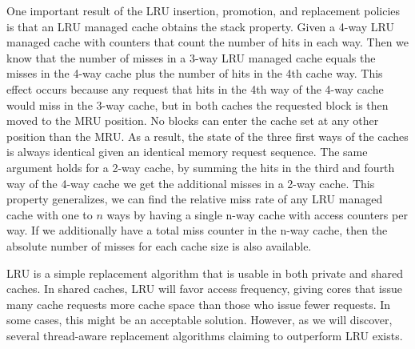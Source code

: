 One important result of the LRU insertion, promotion, and replacement policies is that an LRU managed cache obtains the stack property.
Given a 4-way LRU managed cache with counters that count the number of hits in each way. 
Then we know that the number of misses in a 3-way LRU managed cache equals the misses in the 4-way cache plus the number of hits in the 4th cache way.
This effect occurs because any request that hits in the 4th way of the 4-way cache would miss in the 3-way cache, but in both caches the requested block is then moved to the MRU position.
No blocks can enter the cache set at any other position than the MRU.
As a result, the state of the three first ways of the caches is always identical given an identical memory request sequence.
The same argument holds for a 2-way cache, by summing the hits in the third and fourth way of the 4-way cache we get the additional misses in a 2-way cache.
This property generalizes, we can find the relative miss rate of any LRU managed cache with one to $n$ ways by having a single n-way cache with access counters per way.
If we additionally have a total miss counter in the n-way cache, then the absolute number of misses for each cache size is also available.

LRU is a simple replacement algorithm that is usable in both private and shared caches.
In shared caches, LRU will favor access frequency, giving cores that issue many cache requests more cache space than those who issue fewer requests. 
In some cases, this might be an acceptable solution. 
However, as we will discover, several thread-aware replacement algorithms claiming to outperform LRU exists. 
